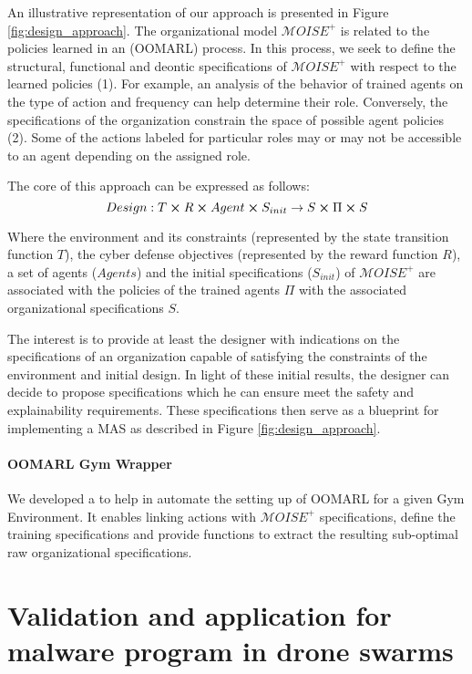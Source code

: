 \documentclass[runningheads]{llncs}
\begin{document}
An illustrative representation of our approach is presented in Figure \ref{fig:design_approach}. The organizational model $\mathcal{M}OISE^{+}$ is related to the policies learned in an  (OOMARL) process. In this process, we seek to define the structural, functional and deontic specifications of $\mathcal{M}OISE^{+}$ with respect to the learned policies (1). For example, an analysis of the behavior of trained agents on the type of action and frequency can help determine their role. Conversely, the specifications of the organization constrain the space of possible agent policies (2). Some of the actions labeled for particular roles may or may not be accessible to an agent depending on the assigned role.

The core of this approach can be expressed as follows:\begin{equation} %
  Design: T \cross R \cross Agent \cross S_{init} \rightarrow S \cross \Pi \cross S
\end{equation}

Where the environment and its constraints (represented by the state transition function $T$), the cyber defense objectives (represented by the reward function $R$), a set of agents ($Agents$) and the initial specifications ($S_{init}$) of $\mathcal{M}OISE^{+}$ are associated with the policies of the trained agents $\Pi$ with the associated organizational specifications $S$.

The interest is to provide at least the designer with indications on the specifications of an organization capable of satisfying the constraints of the environment and initial design. In light of these initial results, the designer can decide to propose specifications which he can ensure meet the safety and explainability requirements. These specifications then serve as a blueprint for implementing a MAS as described in Figure \ref{fig:design_approach}.

\paragraph{\textbf{OOMARL Gym Wrapper}\label{gym-wrapper}} We developed a  to help in automate the setting up of OOMARL for a given Gym Environment. It enables linking actions with $\mathcal{M}OISE^+$ specifications, define the training specifications and provide functions to extract the resulting sub-optimal raw organizational specifications.

\section{Validation and application for malware program in drone swarms}
\end{document}
